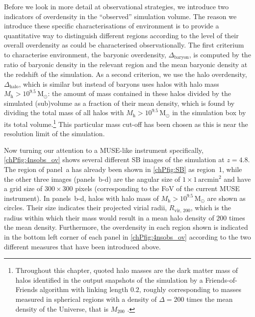 Before we look in more detail at observational strategies, we introduce two indicators of overdensity in the ``observed'' simulation volume. The reason we introduce these specific characterisations of environment is to provide a quantitative way to distinguish different regions according to the level of their overall overdensity as could be characterised observationally. The first criterium to characterise environment, the baryonic overdensity, $\Delta_\mathrm{baryon}$, is computed by the ratio of baryonic density in the relevant region and the mean baryonic density at the redshift of the simulation. As a second criterion, we use the halo overdensity, $\Delta_\mathrm{halo}$, which is similar but instead of baryons uses halos with halo mass $M_\mathrm{h} > 10^{9.5} \, \mathrm{M_\odot}$: the amount of mass contained in these halos divided by the simulated (sub)volume as a fraction of their mean density, which is found by dividing the total mass of all halos with $M_\mathrm{h} > 10^{9.5} \, \mathrm{M_\odot}$ in the simulation box by its total volume.\footnote{Throughout this chapter, quoted halo masses are the dark matter mass of halos identified in the output snapshots of the simulation by a Friends-of-Friends algorithm with linking length $0.2$, roughly corresponding to masses measured in spherical regions with a density of $\Delta = 200$ times the mean density of the Universe, that is $M_\mathrm{200}$ \citep[\cref{chIssec:Non-linear_collapse}; see also][]{2008ApJ...688..709T}.} This particular mass cut-off has been chosen as this is near the resolution limit of the simulation.

Now turning our attention to a MUSE-like instrument specifically, \cref{chPfig:4nsobs_ov} shows several different SB images of the simulation at $z=4.8$. The region of panel~a has already been shown in \cref{chPfig:SB} as region~1, while the other three images (panels~b-d) are the angular size of $1 \times 1 \, \mathrm{arcmin}^2$ and have a grid size of $300 \times 300$ pixels (corresponding to the FoV of the current MUSE instrument). In panels~b-d, halos with halo mass of $M_\mathrm{h} > 10^{9.5} \, \mathrm{M_\odot}$ are shown as circles. Their size indicates their projected virial radii, $R_\mathrm{vir, \, 200}$, which is the radius within which their mass would result in a mean halo density of $200$ times the mean density. Furthermore, the overdensity in each region shown is indicated in the bottom left corner of each panel in \cref{chPfig:4nsobs_ov} according to the two different measures that have been introduced above.

